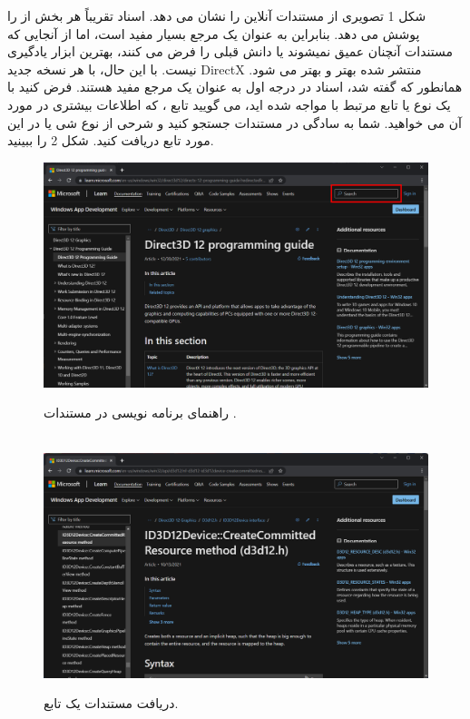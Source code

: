 {شکل 1 تصویری از مستندات آنلاین را نشان می دهد.
اسناد  تقریباً هر بخش از  را پوشش می دهد.
بنابراین به عنوان یک مرجع بسیار مفید است، اما از آنجایی که مستندات آنچنان عمیق نمیشوند یا دانش قبلی را فرض می کنند، بهترین ابزار یادگیری نیست. با این حال، با هر نسخه جدید DirectX منتشر شده بهتر و بهتر می شود.
همانطور که گفته شد، اسناد در درجه اول به عنوان یک مرجع مفید هستند.
فرض کنید با یک نوع یا تابع مرتبط با  مواجه شده اید، می گویید تابع ، که اطلاعات بیشتری در مورد آن می خواهید.
شما به سادگی در مستندات جستجو کنید و شرحی از نوع شی یا در این مورد تابع دریافت کنید. شکل 2 را ببینید.
    \begin{figure}[H]
        \centering
        \setlength{\belowcaptionskip}{-10pt}
        \includegraphics[width=\textwidth]{Images/1.Intro.1.1.png}
        \caption{راهنمای برنامه نویسی  در مستندات .}
        \\[20pt]
        \includegraphics[width=\textwidth]{Images/1.Intro.1.2.png}
        \caption{دریافت مستندات یک تابع.}
    \end{figure}

}
